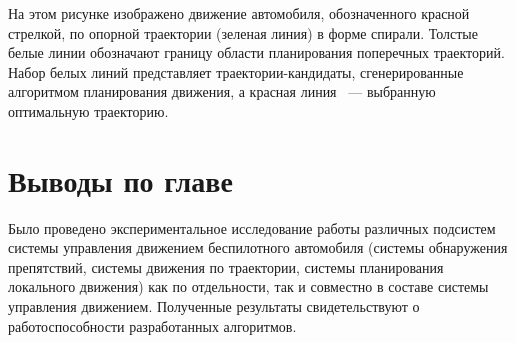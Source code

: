 На этом рисунке изображено движение автомобиля, обозначенного
красной стрелкой, по опорной траектории (зеленая линия) в форме спирали. Толстые белые линии обозначают границу области
планирования поперечных траекторий. Набор белых линий представляет траектории-кандидаты, сгенерированные алгоритмом
планирования движения, а красная линия ~--- выбранную оптимальную траекторию.

\section{Выводы по главе}

Было проведено экспериментальное исследование работы различных подсистем системы управления движением
беспилотного автомобиля (системы обнаружения препятствий, системы движения по траектории, системы планирования локального
движения) как по отдельности, так и совместно в составе системы управления движением. Полученные результаты
свидетельствуют о работоспособности разработанных алгоритмов.